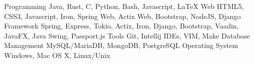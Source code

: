 \begin{cvskills}
	\cvskill
	  {Programming}
	  {Java, Rust, C, Python, Bash, Javascript, LaTeX}
	\cvskill
	  {Web}
	  {HTML5, CSS3, Javascript, Iron, Spring Web, Actix Web, Bootstrap, NodeJS, Django}
	\cvskill
	  {Framework}
	  {Spring, Express, Tokio, Actix, Iron, Django, Bootstrap, Vaadin, JavaFX, Java Swing, Passport.js}
	\cvskill
	  {Tools}
	  {Git, Intellij IDEs, VIM, Make}
	\cvskill
	  {Database Management}
	  {MySQL/MariaDB, MongoDB, PostgreSQL}
	\cvskill
	  {Operating System}
	  {Windows, Mac OS X, Linux/Unix}
\end{cvskills}
